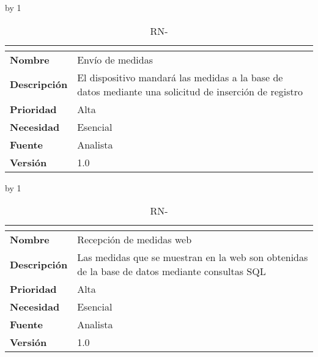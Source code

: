 \advance\rn by 1
\begin{table}[H]
	\caption{RN-\number\rn}
	\begin{tabular}{|l|p{}|}
		\hline
		\multicolumn{2}{|c|}{\cellcolor[HTML]{BFBFBF}{\color[HTML]{000000} \textbf{RN-\number\rn}}} \\ \hline
		\textbf{Nombre}      & Envío de medidas                                                                                      \\ \hline
		\textbf{Descripción} & El dispositivo mandará las medidas a la base de datos mediante una solicitud de inserción de registro \\ \hline
		\textbf{Prioridad}   & Alta                                                                                                  \\ \hline
		\textbf{Necesidad}   & Esencial                                                                                              \\ \hline
		\textbf{Fuente}      & Analista                                                                                              \\ \hline
		\textbf{Versión}     & 1.0                                                                                                   \\ \hline
	\end{tabular}
\end{table}
\advance\rn by 1
\begin{table}[H]
	\caption{RN-\number\rn}
	\begin{tabular}{|l|p{}|}
		\hline
		\multicolumn{2}{|c|}{\cellcolor[HTML]{BFBFBF}{\color[HTML]{000000} \textbf{RN-\number\rn}}} \\ \hline
		\textbf{Nombre}      & Recepción de medidas web                                                                       \\ \hline
		\textbf{Descripción} & Las medidas que se muestran en la web son obtenidas de la base de datos mediante consultas SQL \\ \hline
		\textbf{Prioridad}   & Alta                                                                                           \\ \hline
		\textbf{Necesidad}   & Esencial                                                                                       \\ \hline
		\textbf{Fuente}      & Analista                                                                                       \\ \hline
		\textbf{Versión}     & 1.0                                                                                            \\ \hline
	\end{tabular}
\end{table}
